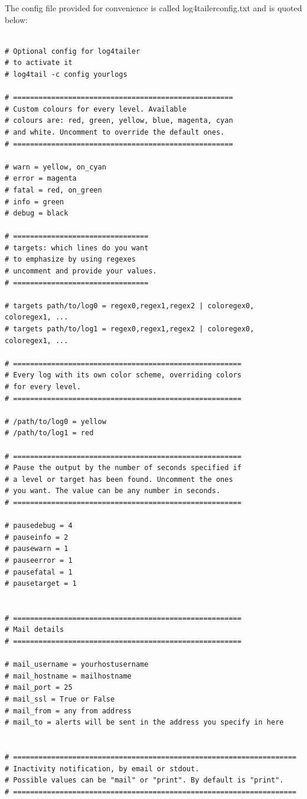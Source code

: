 The config file provided for convenience is called log4tailerconfig.txt and is quoted below:
\begin{verbatim}

# Optional config for log4tailer
# to activate it
# log4tail -c config yourlogs

# ====================================================
# Custom colours for every level. Available 
# colours are: red, green, yellow, blue, magenta, cyan 
# and white. Uncomment to override the default ones.
# ====================================================

# warn = yellow, on_cyan
# error = magenta 
# fatal = red, on_green
# info = green
# debug = black

# ================================
# targets: which lines do you want 
# to emphasize by using regexes
# uncomment and provide your values.
# ================================

# targets path/to/log0 = regex0,regex1,regex2 | coloregex0, coloregex1, ...
# targets path/to/log1 = regex0,regex1,regex2 | coloregex0, coloregex1, ...

# ======================================================
# Every log with its own color scheme, overriding colors 
# for every level.
# ======================================================

# /path/to/log0 = yellow
# /path/to/log1 = red

# ======================================================
# Pause the output by the number of seconds specified if 
# a level or target has been found. Uncomment the ones 
# you want. The value can be any number in seconds. 
# ======================================================

# pausedebug = 4
# pauseinfo = 2
# pausewarn = 1
# pauseerror = 1
# pausefatal = 1
# pausetarget = 1


# ======================================================
# Mail details 
# ======================================================

# mail_username = yourhostusername
# mail_hostname = mailhostname
# mail_port = 25
# mail_ssl = True or False
# mail_from = any from address
# mail_to = alerts will be sent in the address you specify in here


# ===================================================================
# Inactivity notification, by email or stdout.
# Possible values can be "mail" or "print". By default is "print".
# ===================================================================


\end{verbatim}

